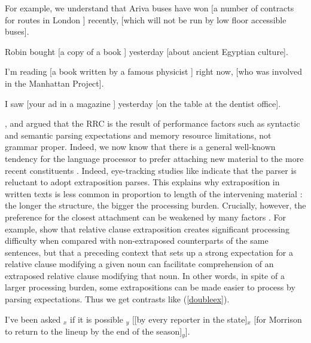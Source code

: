 \documentclass[output=paper]{langsci/langscibook}
\begin{document}
\item  For example, we understand that Ariva buses have won [a number
of contracts for routes in London \spc] recently,
[which will not be run by low floor accessible buses].

\item Robin bought [a copy of a book \spc] yesterday [about ancient Egyptian culture].


\item I'm reading [a book written by  a famous physicist
\spc]
right now, [who was involved in the Manhattan Project].

\item I saw [your ad in a magazine \spc] yesterday [on the table at the dentist office].
\z \label{nosubza}
\z


 \citet{grosurrc},  \citet{gazdar} and \citet{stucky} argued that the RRC is the result of
  performance  factors such as  syntactic and semantic parsing expectations and  memory resource  limitations,  not grammar proper.   Indeed, we now know that  there is a general well-known  tendency for the language processor to  prefer attaching new material
 to the more recent constituents  \citep{frazcl,gibetal,trax98,fodor02b,fernandez03}. 
Indeed, eye-tracking studies like \citet{hnps}  indicate that the
parser is reluctant to adopt  extraposition  parses.
This  explains why     extraposition in written texts
is less common in proportion to length of  the  intervening material \citep{UBDKKOS98b}:
the longer the structure, the bigger the processing burden. 
 Crucially, however, the preference for the closest attachment can be weakened by
many factors \citep{fernandez03,desmet,devic,carreras}. 
For example,  \citet{levyted}  show that relative clause extraposition creates
 significant processing difficulty when compared with  non-extraposed counterparts of 
 the same sentences,   but that a preceding context that sets up a strong expectation
for a relative clause modifying a given noun can  facilitate
comprehension of an extraposed relative clause modifying that noun.
In other words, in spite of a larger processing burden,
some extrapositions can be made easier to process by parsing expectations.
Thus we get contrasts like (\ref{doubleex}).


\ea \label{doubleex}
\ea I've been asked \spc$_x$ if it is possible \spc$_y$ [[by every reporter in the state]$_x$
 [for Morrison to return to the lineup by the end of the season]$_y$].\\
\citep{chavesrnr} \label{mine}
\end{document}
